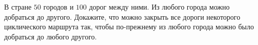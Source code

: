 В стране $50$ городов и $100$ дорог между ними. Из любого города можно добраться до другого. Докажите, что можно закрыть все дороги некоторого циклического маршрута так, чтобы по-прежнему из любого города можно было добраться до любого другого.